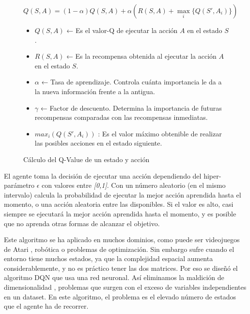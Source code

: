 		
		\begin{figure}[!h]				
		\begin{flushleft}
		\begin{mdframed}[roundcorner=5pt]
			\[
			Q(S,A) = (1 - \alpha) Q(S,A) + \alpha \left( R(S,A) + \max_{i} \{ Q(S',A_i) \} \right)
			\]
			\begin{itemize}
				\item \( Q(S,A) \) ← Es el valor-Q de ejecutar la acción \( A \) en el estado \( S \).
				\item \( R(S,A) \) ← Es la recompensa obtenida al ejecutar la acción \( A \) en el estado \( S \).
				\item \( \alpha \) ← Tasa de aprendizaje. Controla cuánta importancia le da a la nueva información frente a la antigua.
				\item \( \gamma \) ← Factor de descuento. Determina la importancia de futuras recompensas comparadas con las recompensas inmediatas.
				\item \( max_{i}(Q(S',A_i)) \) : Es el valor máximo obtenible de realizar las posibles acciones en el estado siguiente.
			\end{itemize}
		\end{mdframed}		
		\end{flushleft}
		\caption{Cálculo del Q-Value de un estado y acción}	
		\label{fig:qvalue}
		\end{figure}
		
		
		El agente toma la decisión de ejecutar una acción dependiendo del hiper-parámetro $\epsilon$  con valores entre \textit{[0,1]}. Con un número aleatorio (en el mismo intervalo) calcula la probabilidad de ejecutar la mejor acción aprendida hasta el momento, o una acción aleatoria entre las disponibles. Si el valor es alto, casi siempre se ejecutará la mejor acción aprendida hasta el momento, y es posible que no aprenda otras formas de alcanzar el objetivo.
		
		
		Este algoritmo se ha aplicado en muchos dominios, como puede ser videojuegos de Atari \cite{mnih2013playing}, robótica o problemas de optimización. Sin embargo sufre cuando el entorno tiene muchos estados, ya que la complejidad espacial aumenta considerablemente, y no es práctico tener las dos matrices. Por eso se diseñó el algoritmo DQN que usa una red neuronal. Así eliminamos la maldición de dimensionalidad \cite{kuo2005lifting}, problemas que surgen con el exceso de variables independientes en un dataset. En este algoritmo, el problema es el elevado número de estados que el agente ha de recorrer.
		
